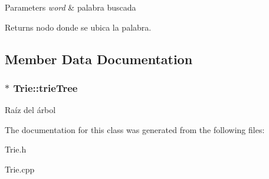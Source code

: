 \begin{DoxyParams}{Parameters}
{\em word} & palabra buscada \\
\hline
\end{DoxyParams}
\begin{DoxyReturn}{Returns}
nodo donde se ubica la palabra. 
\end{DoxyReturn}


\subsection{Member Data Documentation}
\subsubsection[{trie\-Tree}]{$\ast$ Trie\-::trie\-Tree}\label{class_trie_a301aa208fe6fc7abaaf264c117070ed6}
Raíz del árbol 

The documentation for this class was generated from the following files\-:\begin{DoxyCompactItemize}
\item 
Trie.\-h\item 
Trie.\-cpp\end{DoxyCompactItemize}
